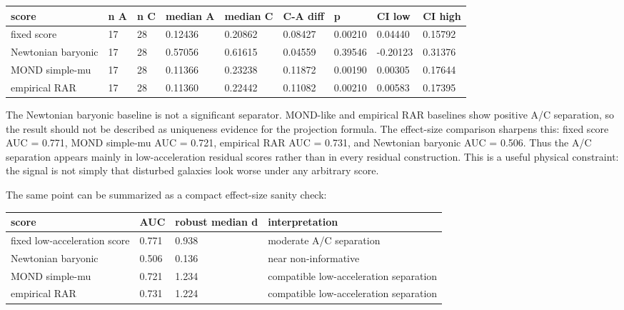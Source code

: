 \documentclass[11pt]{article}
\begin{document}
\begin{table}[htbp]
\centering
\footnotesize
\setlength{\tabcolsep}{3pt}
\begin{tabularx}{\linewidth}{Y Y Y Y Y Y Y Y Y}
\toprule
score & n A & n C & median A & median C & C-A diff & p & CI low & CI high \\
\midrule
fixed score & 17 & 28 & 0.12436 & 0.20862 & 0.08427 & 0.00210 & 0.04440 & 0.15792 \\
Newtonian baryonic & 17 & 28 & 0.57056 & 0.61615 & 0.04559 & 0.39546 & -0.20123 & 0.31376 \\
MOND simple-mu & 17 & 28 & 0.11366 & 0.23238 & 0.11872 & 0.00190 & 0.00305 & 0.17644 \\
empirical RAR & 17 & 28 & 0.11360 & 0.22442 & 0.11082 & 0.00210 & 0.00583 & 0.17395 \\
\bottomrule
\end{tabularx}
\end{table}
The Newtonian baryonic baseline is not a significant separator. MOND-like and empirical RAR baselines show positive A/C separation, so the result should not be described as uniqueness evidence for the projection formula. The effect-size comparison sharpens this: fixed score AUC = 0.771, MOND simple-mu AUC = 0.721, empirical RAR AUC = 0.731, and Newtonian baryonic AUC = 0.506. Thus the A/C separation appears mainly in low-acceleration residual scores rather than in every residual construction. This is a useful physical constraint: the signal is not simply that disturbed galaxies look worse under any arbitrary score.

The same point can be summarized as a compact effect-size sanity check:

\begin{table}[htbp]
\centering
\footnotesize
\setlength{\tabcolsep}{3pt}
\begin{tabularx}{\linewidth}{Y Y Y Y}
\toprule
score & AUC & robust median d & interpretation \\
\midrule
fixed low-acceleration score & 0.771 & 0.938 & moderate A/C separation \\
Newtonian baryonic & 0.506 & 0.136 & near non-informative \\
MOND simple-mu & 0.721 & 1.234 & compatible low-acceleration separation \\
empirical RAR & 0.731 & 1.224 & compatible low-acceleration separation \\
\bottomrule
\end{tabularx}
\end{table}
\end{document}

